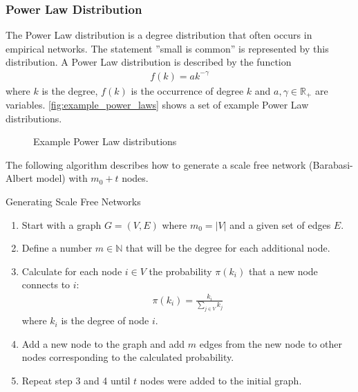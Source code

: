 \documentclass[english]{panikzettel}
\begin{document}
\subsubsection{Power Law Distribution}\label{sec:power_law}
The Power Law distribution is a degree distribution that often occurs in empirical networks.
The statement ''small is common'' is represented by this distribution.
A Power Law distribution is described by the function
\begin{align*}
	f(k) = ak^{-\gamma}
\end{align*}
where $ k $ is the degree, $ f(k) $ is the occurrence of degree $ k $ and $ a,\gamma \in \mathbb{R}_+ $ are variables. \autoref{fig:example_power_laws} shows a set of example Power Law distributions.

\begin{figure}[ht!]
	\centering
	\caption{Example Power Law distributions}
	\label{fig:example_power_laws}
\end{figure}

The following algorithm describes how to generate a scale free network (Barabasi-Albert model) with $ m_0 + t $ nodes.

\begin{algo}{Generating Scale Free Networks}
\begin{enumerate}
	\item Start with a graph $ G = (V,E) $ where $ m_0 = |V| $ and a given set of edges $ E $.
	\item Define a number $ m \in \mathbb{N} $ that will be the degree for each additional node. 
	\item Calculate for each node $ i \in V $ the probability $ \pi(k_i) $ that a new node connects to $ i $:
	\begin{align*}
		\pi(k_i) = \frac{k_i}{\sum_{j \in V} k_j}
	\end{align*}
	where $ k_i $ is the degree of node $ i $.
	\item Add a new node to the graph and add $ m $ edges from the new node to other nodes corresponding to the calculated probability.
	\item Repeat step 3 and 4 until $ t $ nodes were added to the initial graph.
\end{enumerate}
\end{algo}
\end{document}
